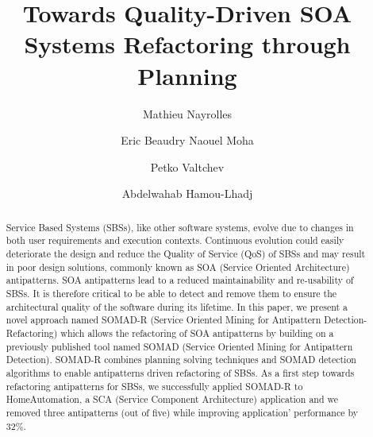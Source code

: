\documentclass[lnbip]{svmultln}
\begin{document}
%
\mainmatter              %
%
\title{Towards Quality-Driven SOA Systems Refactoring through Planning}
%
%
\author{Mathieu Nayrolles \and Eric Beaudry
Naouel Moha \and Petko Valtchev \and Abdelwahab Hamou-Lhadj }
%
%

\maketitle              %

\begin{abstract}        %
Service Based Systems (SBSs), like other software systems, evolve due to changes in both user requirements and execution contexts. Continuous evolution could easily deteriorate the design and reduce the Quality of Service (QoS) of SBSs and may result in poor design solutions, commonly known as SOA (Service Oriented Architecture) antipatterns. SOA antipatterns lead to a reduced maintainability and re-usability of SBSs. It is therefore critical to be able to detect and remove them to ensure the architectural quality of the software during its lifetime. In this paper, we present a novel approach named SOMAD-R (Service Oriented Mining for Antipattern Detection-Refactoring) which allows the refactoring of SOA antipatterns by building on a previously published tool named SOMAD (Service Oriented Mining for Antipattern Detection). SOMAD-R combines planning solving techniques and SOMAD detection algorithms to enable antipatterns driven refactoring of SBSs. As a first step towards refactoring antipatterns for SBSs, we successfully applied SOMAD-R to HomeAutomation, a SCA (Service Component Architecture) application and we removed three antipatterns (out of five) while improving application’ performance by 32\%.
\end{abstract}
%
\end{document}
